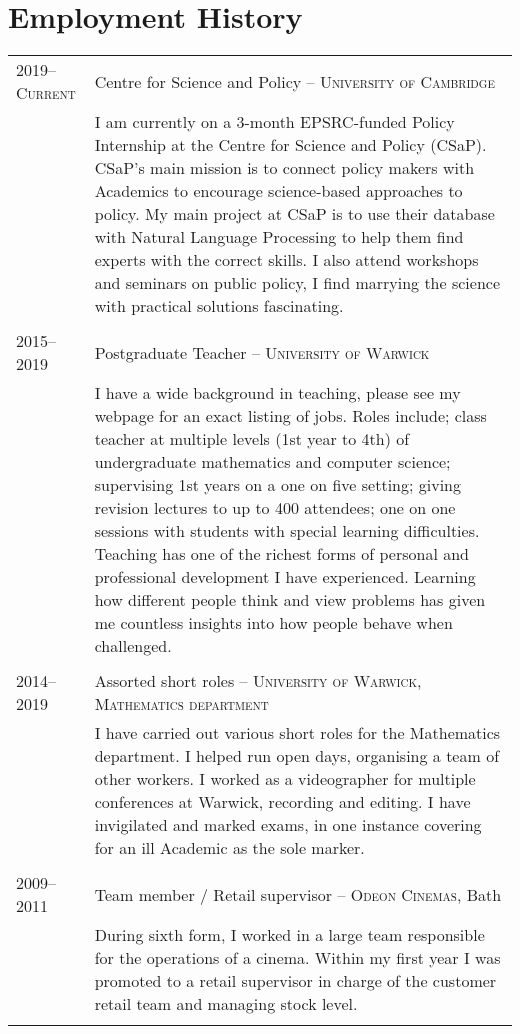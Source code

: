 \documentclass[a4paper,10pt]{article}
\begin{document}
\section{Employment History}
\begin{tabular}{p{2.25cm}|p{15cm}}
	\textsc{2019--Current} & Centre for Science and Policy -- \textsc{University of Cambridge}\\&\footnotesize{I am currently on a 3-month EPSRC-funded Policy Internship at the Centre for Science and Policy (CSaP). CSaP's main mission is to connect policy makers with Academics to encourage science-based approaches to policy. My main project at CSaP is to use their database with Natural Language Processing to help them find experts with the correct skills. I also attend workshops and seminars on public policy, I find marrying the science with practical solutions fascinating.}\\\multicolumn{2}{c}{} \\
	\textsc{2015--2019} & Postgraduate Teacher -- \textsc{University of Warwick}\\&\footnotesize{I have a wide background in teaching, please see my webpage for an exact listing of jobs. Roles include; class teacher at multiple levels (1st year to 4th) of undergraduate mathematics and computer science; supervising 1st years on a one on five setting; giving revision lectures to up to 400 attendees; one on one sessions with students with special learning difficulties. Teaching has one of the richest forms of personal and professional development I have experienced. Learning how different people think and view problems has given me countless insights into how people behave when challenged.}\\\multicolumn{2}{c}{} \\
	\textsc{2014--2019} & Assorted short roles -- \textsc{University of Warwick, Mathematics department}\\&\footnotesize{I have carried out various short roles for the Mathematics department. I helped run open days, organising a team of other workers. I worked as a videographer for multiple conferences at Warwick, recording and editing. I have invigilated and marked exams, in one instance covering for an ill Academic as the sole marker.}\\\multicolumn{2}{c}{} \\
	\textsc{2009--2011}& Team member / Retail supervisor -- \textsc{Odeon Cinemas}, Bath\\&\footnotesize{During sixth form, I worked in a large team responsible for the operations of a cinema. Within my first year I was promoted to a retail supervisor in charge of the customer retail team and managing stock level. }\\\multicolumn{2}{c}{} \\
\end{tabular}
\end{document}
